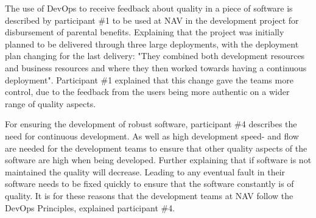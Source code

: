 
The use of DevOps to receive feedback about quality in a piece of software is described by participant \#1 to be used at NAV in the development project for disbursement of parental benefits. Explaining that the project was initially planned to be delivered through three large deployments, with the deployment plan changing for the last delivery: "They combined both development resources and business resources and where they then worked towards having a continuous deployment". Participant \#1 explained that this change gave the teams more control, due to the feedback from the users being more authentic on a wider range of quality aspects. 


For ensuring the development of robust software, participant \#4 describes the need for continuous development. As well as high development speed- and flow are needed for the development teams to ensure that other quality aspects of the software are high when being developed. Further explaining that if software is not maintained the quality will decrease. Leading to any eventual fault in their software needs to be fixed quickly to ensure that the software constantly is of quality. It is for these reasons that the development teams at NAV follow the DevOps Principles, explained participant \#4.

